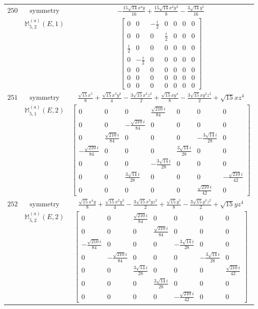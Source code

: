 \documentclass[fleqn,8pt,landscape]{jsarticle}
\begin{document}
\begin{longtable}{ccc}
$ 250 $ & $ \text{symmetry} $ & $ - \frac{15 \sqrt{14} x^{4} y}{16} + \frac{15 \sqrt{14} x^{2} y^{3}}{8} - \frac{3 \sqrt{14} y^{5}}{16} $ \\
$  $ & $ \mathbb{M}_{5,2}^{(a)}(E,1) $ & $ \begin{bmatrix} 0 & 0 & - \frac{i}{2} & 0 & 0 & 0 & 0 \\ 0 & 0 & 0 & \frac{i}{2} & 0 & 0 & 0 \\ \frac{i}{2} & 0 & 0 & 0 & 0 & 0 & 0 \\ 0 & - \frac{i}{2} & 0 & 0 & 0 & 0 & 0 \\ 0 & 0 & 0 & 0 & 0 & 0 & 0 \\ 0 & 0 & 0 & 0 & 0 & 0 & 0 \\ 0 & 0 & 0 & 0 & 0 & 0 & 0 \end{bmatrix} $ \\ \hline
$ 251 $ & $ \text{symmetry} $ & $ \frac{\sqrt{15} x^{5}}{8} + \frac{\sqrt{15} x^{3} y^{2}}{4} - \frac{3 \sqrt{15} x^{3} z^{2}}{2} + \frac{\sqrt{15} x y^{4}}{8} - \frac{3 \sqrt{15} x y^{2} z^{2}}{2} + \sqrt{15} x z^{4} $ \\
$  $ & $ \mathbb{M}_{5,1}^{(a)}(E,2) $ & $ \begin{bmatrix} 0 & 0 & 0 & \frac{\sqrt{210} i}{84} & 0 & 0 & 0 \\ 0 & 0 & - \frac{\sqrt{210} i}{84} & 0 & 0 & 0 & 0 \\ 0 & \frac{\sqrt{210} i}{84} & 0 & 0 & 0 & - \frac{3 \sqrt{14} i}{28} & 0 \\ - \frac{\sqrt{210} i}{84} & 0 & 0 & 0 & \frac{3 \sqrt{14} i}{28} & 0 & 0 \\ 0 & 0 & 0 & - \frac{3 \sqrt{14} i}{28} & 0 & 0 & 0 \\ 0 & 0 & \frac{3 \sqrt{14} i}{28} & 0 & 0 & 0 & - \frac{\sqrt{210} i}{42} \\ 0 & 0 & 0 & 0 & 0 & \frac{\sqrt{210} i}{42} & 0 \end{bmatrix} $ \\ \hline
$ 252 $ & $ \text{symmetry} $ & $ \frac{\sqrt{15} x^{4} y}{8} + \frac{\sqrt{15} x^{2} y^{3}}{4} - \frac{3 \sqrt{15} x^{2} y z^{2}}{2} + \frac{\sqrt{15} y^{5}}{8} - \frac{3 \sqrt{15} y^{3} z^{2}}{2} + \sqrt{15} y z^{4} $ \\
$  $ & $ \mathbb{M}_{5,2}^{(a)}(E,2) $ & $ \begin{bmatrix} 0 & 0 & \frac{\sqrt{210} i}{84} & 0 & 0 & 0 & 0 \\ 0 & 0 & 0 & \frac{\sqrt{210} i}{84} & 0 & 0 & 0 \\ - \frac{\sqrt{210} i}{84} & 0 & 0 & 0 & - \frac{3 \sqrt{14} i}{28} & 0 & 0 \\ 0 & - \frac{\sqrt{210} i}{84} & 0 & 0 & 0 & - \frac{3 \sqrt{14} i}{28} & 0 \\ 0 & 0 & \frac{3 \sqrt{14} i}{28} & 0 & 0 & 0 & \frac{\sqrt{210} i}{42} \\ 0 & 0 & 0 & \frac{3 \sqrt{14} i}{28} & 0 & 0 & 0 \\ 0 & 0 & 0 & 0 & - \frac{\sqrt{210} i}{42} & 0 & 0 \end{bmatrix} $ \\ \hline

\end{longtable}
\end{document}
